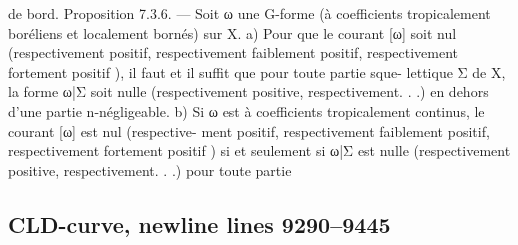 \documentclass[
  10pt,
]{article}
\newenvironment{Shaded}{}{}
\newcommand{\NormalTok}[1]{#1}
\begin{document}
\begin{Shaded}
\begin{Highlighting}[]
\NormalTok{de bord.}
\NormalTok{Proposition 7.3.6. — Soit ω une G{-}forme (à coefficients tropicalement boréliens et}
\NormalTok{localement bornés) sur X.}
\NormalTok{   a) Pour que le courant [ω] soit nul (respectivement positif, respectivement faiblement}
\NormalTok{positif, respectivement fortement positif ), il faut et il suffit que pour toute partie sque{-}}
\NormalTok{lettique Σ de X, la forme ω|Σ soit nulle (respectivement positive, respectivement. . .) en}
\NormalTok{dehors d’une partie n{-}négligeable.}
\NormalTok{   b) Si ω est à coefficients tropicalement continus, le courant [ω] est nul (respective{-}}
\NormalTok{ment positif, respectivement faiblement positif, respectivement fortement positif ) si et}
\NormalTok{seulement si ω|Σ est nulle (respectivement positive, respectivement. . .) pour toute partie}
\end{Highlighting}
\end{Shaded}

\subsection{CLD-curve, newline lines
9290--9445}\label{cld-curve-newline-lines-92909445}
\end{document}
